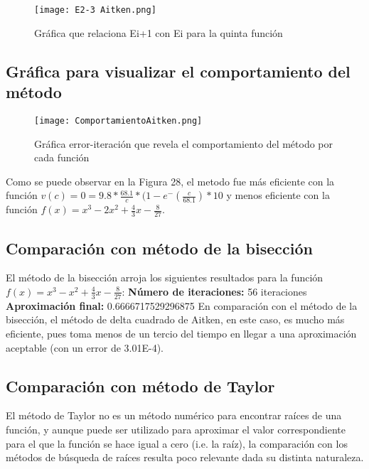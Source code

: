 \documentclass{article}
\begin{document}
\begin{figure}[H]
    \centering
    \texttt{[image: E2-3 Aitken.png]}
    \caption{Gráfica que relaciona Ei+1 con Ei para la quinta función}
    \label{fig:E2-3 Aitken}
\end{figure}

\subsection{Gráfica para visualizar el comportamiento del método}

\begin{figure}[H]
    \centering
    \texttt{[image: ComportamientoAitken.png]}
    \caption{Gráfica error-iteración que revela el comportamiento del método por cada función}
    \label{fig:ComportamientoAitken}
\end{figure}

Como se puede observar en la Figura 28, el metodo fue más eficiente con la función \(v(c) = 0 = 9.8* \frac{68.1}{c}*(1-e^-(\frac{c}{68.1})*10\) y menos eficiente con la función \(f(x) = x^3-2x^2+\frac{4}{3}x-\frac{8}{27}\).

\subsection{Comparación con método de la bisección}
El método de la bisección arroja los siguientes resultados para la función \(f(x) = x^3-x^2+\frac{4}{3}x-\frac{8}{27}\):
\textbf{Número de iteraciones:} 56 iteraciones
\textbf{Aproximación final:} 0.6666717529296875
En comparación con el método de la bisección, el método de delta cuadrado de Aitken, en este caso, es mucho más eficiente, pues toma menos de un tercio del tiempo en llegar a una aproximación aceptable (con un error de 3.01E-4).
\subsection{Comparación con método de Taylor}
El método de Taylor no es un método numérico para encontrar raíces de una función, y aunque puede ser utilizado para aproximar el valor correspondiente para el que la función se hace igual a cero (i.e. la raíz), la comparación con los métodos de búsqueda de raíces resulta poco relevante dada su distinta naturaleza.
\end{document}
